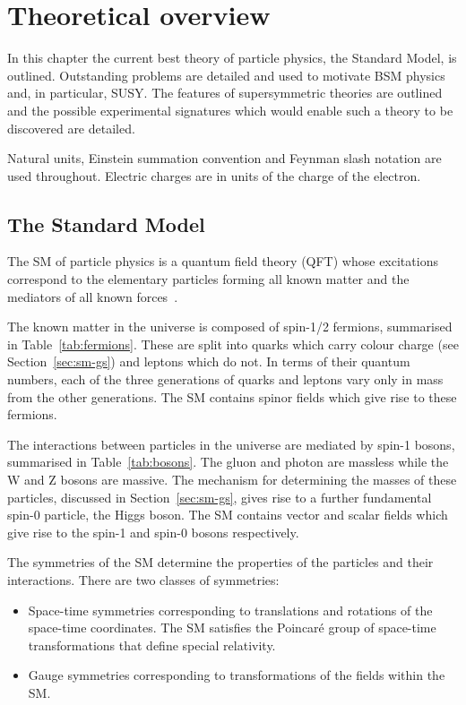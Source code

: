 \chapter{Theoretical overview}
\label{cha:theory}

In this chapter the current best theory of particle physics, the Standard Model,
is outlined. Outstanding problems are detailed and used to motivate BSM 
physics and, in particular, SUSY. The features of supersymmetric theories are 
outlined and the possible experimental signatures which would enable such a theory to be 
discovered are detailed.

Natural units, Einstein summation convention
and Feynman slash notation are used throughout. Electric charges 
are in units of the charge of the electron.

\section{The Standard Model}

\label{sec:sm}

The SM of particle physics is a quantum field theory (QFT) whose excitations
correspond to the elementary particles forming all known matter and the mediators of
all known forces~\cite{ftsm}. 

The known matter in the universe is composed of spin-1/2 fermions, summarised 
in Table~\ref{tab:fermions}. These are split into quarks which carry colour charge 
(see Section~\ref{sec:sm-gs}) and leptons which do not. In terms of their
quantum numbers, each of the three 
generations of quarks and leptons vary only in mass from the other generations. 
The SM contains spinor fields which give rise to these fermions.

The interactions between particles in the universe are mediated by
spin-1 bosons, summarised in Table~\ref{tab:bosons}. 
The gluon and photon are massless while the W and Z bosons are massive. 
The mechanism for determining the masses of these particles, discussed in 
Section~\ref{sec:sm-gs}, gives rise to a further fundamental spin-0 particle, the Higgs boson.
The SM contains vector and scalar fields which give rise to the spin-1 and spin-0
bosons respectively.

The symmetries of the SM determine the properties of the particles and 
their interactions. There are two classes of symmetries:

\begin{itemize}
\item Space-time symmetries corresponding to translations and rotations of the space-time coordinates.
The SM satisfies the Poincar\'{e} group of space-time transformations that define special relativity. 
\item Gauge symmetries corresponding to transformations of the fields within the SM.
\end{itemize}


